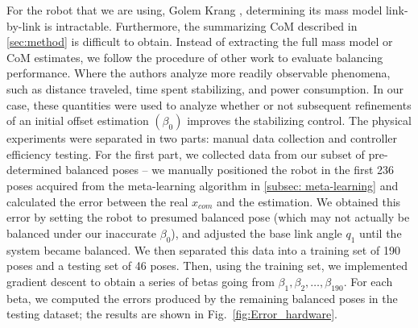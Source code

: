 \documentclass[letterpaper, 10 pt, conference]{ieeeconf}  %
\begin{document}
For the robot that we are using, Golem Krang \cite{Stilman2010}, determining its mass model link-by-link is intractable.  Furthermore, the summarizing \ac{CoM} described in \ref{sec:method} is difficult to obtain.  Instead of extracting the full mass model or \ac{CoM} estimates, we follow the procedure of other work \cite{bature2014comparison,khosla2013performance} to evaluate balancing performance.  Where the authors analyze more readily observable phenomena, such as distance traveled, time spent stabilizing, and power consumption.  In our case, these quantities were used to analyze whether or not subsequent refinements of an initial offset estimation $(\beta_0)$ improves the stabilizing control.
The physical experiments were separated in two parts: manual data collection and controller efficiency testing.
For the first part, we collected data from our subset of pre-determined balanced poses -- we manually positioned the robot in the first 236 poses acquired from the meta-learning algorithm in \cref{subsec: meta-learning} and calculated the error between the real $x_{com}$ and the estimation.  We obtained this error by setting the robot to presumed balanced pose (which may not actually be balanced under our inaccurate $\beta_0$), and adjusted the base link angle $q_1$ until the system became balanced.  We then separated this data into a training set of 190 poses and a testing set of 46 poses.  Then, using the training set, we implemented gradient descent to obtain a series of betas going from $\beta_1, \beta_2, \dots, \beta_{190}$. For each beta, we computed the errors produced by the remaining balanced poses in the testing dataset; the results are shown in Fig.~\ref{fig:Error_hardware}.
\end{document}
